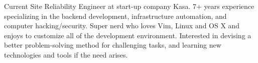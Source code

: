 

\begin{cvparagraph}

Current Site Reliability Engineer at start-up company Kasa. 7+ years experience specializing in the
backend development, infrastructure automation, and computer hacking/security. Super nerd who loves
Vim, Linux and OS X and enjoys to customize all of the development environment. Interested in
devising a better problem-solving method for challenging tasks, and learning new technologies and
tools if the need arises.
\end{cvparagraph}